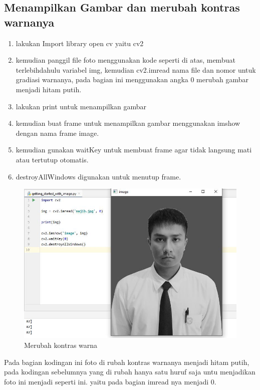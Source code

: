 \newpage
\subsection{Menampilkan Gambar dan merubah kontras warnanya}

\begin{enumerate}
	\item lakukan Import library open cv yaitu cv2
	\item kemudian panggil file foto menggunakan kode seperti di atas, membuat terlebihdahulu variabel img, kemudian cv2.imread nama file dan nomor untuk gradiasi warnanya, pada bagian ini menggunakan angka 0 merubah gambar menjadi hitam putih.
	\item lakukan print untuk menampilkan gambar
	\item kemudian buat frame untuk menampilkan gambar menggunakan imshow dengan nama frame image.
	\item kemudian gunakan waitKey untuk membuat frame agar tidak langsung mati atau tertutup otomatis.
	\item destroyAllWindows digunakan untuk menutup frame.
\end{enumerate}


\begin{figure}[ht]
\centering
\includegraphics[scale=0.5]{figures/2,1.jpg}
\caption{Merubah kontras warna}
\label{contoh}
\end{figure}

Pada bagian kodingan ini foto di rubah kontras warnanya menjadi hitam putih, pada kodingan sebelumnya yang di rubah hanya satu huruf saja untu menjadikan foto ini menjadi seperti ini. yaitu pada bagian imread nya menjadi 0.


